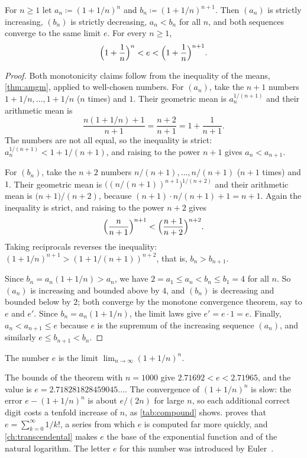 \begin{theorem}
\label{thm:e}
For $n\ge1$ let $a_n\coloneqq(1+1/n)^n$ and $b_n\coloneqq(1+1/n)^{n+1}$. Then $(a_n)$ is strictly increasing, $(b_n)$ is strictly decreasing, $a_n<b_n$ for all $n$, and both sequences converge to the same limit $e$. For every $n\ge1$,
\[
\Bigl(1+\frac1n\Bigr)^n<e<\Bigl(1+\frac1n\Bigr)^{n+1} .
\]
\end{theorem}

\begin{proof}
Both monotonicity claims follow from the inequality of the means, \cref{thm:amgm}, applied to well-chosen numbers. For $(a_n)$, take the $n+1$ numbers $1+1/n,\ldots,1+1/n$ ($n$ times) and $1$. Their geometric mean is $a_n^{1/(n+1)}$ and their arithmetic mean is
\[
\frac{n(1+1/n)+1}{n+1}=\frac{n+2}{n+1}=1+\frac1{n+1} .
\]
The numbers are not all equal, so the inequality is strict: $a_n^{1/(n+1)}<1+1/(n+1)$, and raising to the power $n+1$ gives $a_n<a_{n+1}$.

For $(b_n)$, take the $n+2$ numbers $n/(n+1),\ldots,n/(n+1)$ ($n+1$ times) and $1$. Their geometric mean is $\bigl((n/(n+1))^{n+1}\bigr)^{1/(n+2)}$ and their arithmetic mean is $\bigl(n+1\bigr)/(n+2)$, because $(n+1)\cdot n/(n+1)+1=n+1$. Again the inequality is strict, and raising to the power $n+2$ gives
\[
\Bigl(\frac n{n+1}\Bigr)^{n+1}<\Bigl(\frac{n+1}{n+2}\Bigr)^{n+2} .
\]
Taking reciprocals reverses the inequality: $(1+1/n)^{n+1}>(1+1/(n+1))^{n+2}$, that is, $b_n>b_{n+1}$.

Since $b_n=a_n(1+1/n)>a_n$, we have $2=a_1\le a_n<b_n\le b_1=4$ for all $n$. So $(a_n)$ is increasing and bounded above by $4$, and $(b_n)$ is decreasing and bounded below by $2$; both converge by the monotone convergence theorem, say to $e$ and $e'$. Since $b_n=a_n(1+1/n)$, the limit laws give $e'=e\cdot1=e$. Finally, $a_n<a_{n+1}\le e$ because $e$ is the supremum of the increasing sequence $(a_n)$, and similarly $e\le b_{n+1}<b_n$.
\end{proof}

\begin{definition}
\label{def:e}
The number $e$ is the limit $\lim_{n\to\infty}(1+1/n)^n$.
\end{definition}

The bounds of the theorem with $n=1000$ give $2.71692<e<2.71965$, and the value is $e=2.718281828459045\ldots$. The convergence of $(1+1/n)^n$ is slow: the error $e-(1+1/n)^n$ is about $e/(2n)$ for large $n$, so each additional correct digit costs a tenfold increase of $n$, as \cref{tab:compound} shows.  proves that $e=\sum_{k=0}^\infty1/k!$, a series from which $e$ is computed far more quickly, and \cref{ch:transcendental} makes $e$ the base of the exponential function and of the natural logarithm. The letter $e$ for this number was introduced by Euler~\cite{maor1994}.

